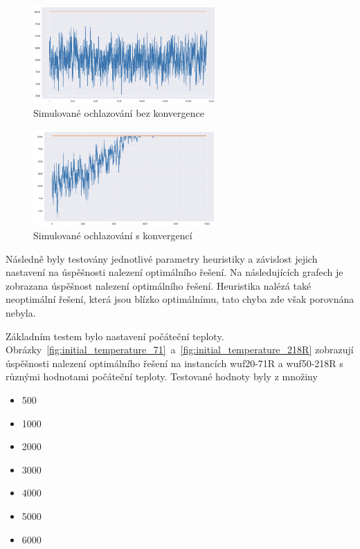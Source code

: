 \documentclass[twoside,twocolumn]{article}
\begin{document}
    \begin{figure}
        \centering
        \includegraphics[width=7cm]{images/no-convergence}
        \caption{Simulované ochlazování bez konvergence}
        \label{fig:no-convergence}
    \end{figure}

    \begin{figure}
        \centering
        \includegraphics[width=7cm]{images/convergence}
        \caption{Simulované ochlazování s konvergencí}
        \label{fig:convergence}
    \end{figure}

    Následně byly testovány jednotlivé parametry heuristiky a závislost jejich nastavení na úspěšnosti nalezení optimálního řešení.
    Na následujících grafech je zobrazana úspěšnost nalezení optimálního řešení.
    Heuristika nalézá také neoptimální řešení, která jsou blízko optimálnímu, tato chyba zde však porovnána nebyla.

    Základním testem bylo nastavení počáteční teploty.
    Obrázky~\ref{fig:initial_temperature_71}~a~\ref{fig:initial_temperature_218R} zobrazují úspěšnosti nalezení optimálního řešení
    na instancích wuf20-71R a wuf50-218R s různými hodnotami počáteční teploty.
    Testované hodnoty byly z množiny

    \begin{itemize}
        \item 500
        \item 1000
        \item 2000
        \item 3000
        \item 4000
        \item 5000
        \item 6000
    \end{itemize}
\end{document}
